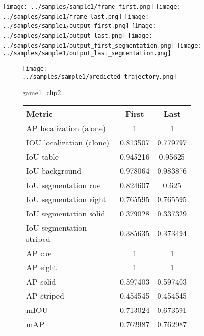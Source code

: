 \begin{figure}
    \texttt{[image: ../samples/sample1/frame\_first.png]}
    \texttt{[image: ../samples/sample1/frame\_last.png]}
    \newline
    \texttt{[image: ../samples/sample1/output\_first.png]}
    \texttt{[image: ../samples/sample1/output\_last.png]}
    \newline
    \texttt{[image: ../samples/sample1/output\_first\_segmentation.png]}
    \texttt{[image: ../samples/sample1/output\_last\_segmentation.png]}
    \newline
    \begin{subfigure}[b]{0.49\textwidth}
        \vspace{20pt}
        \texttt{[image: ../samples/sample1/predicted\_trajectory.png]}
        \caption*{game1\_clip2}
    \end{subfigure}
\begin{subfigure}[b]{0.49\textwidth}
    \begin{tabular}{|l|c|c|}
        \hline
        \textbf{Metric} & \textbf{First} & \textbf{Last} \\
        \hline
        AP localization (alone) & 1 & 1 \\ 
        IOU localization (alone) & 0.813507 & 0.779797 \\ 
        \hline
        IoU table & 0.945216 & 0.95625 \\ 
        IoU background & 0.978064 & 0.983876 \\ 
        \hline
        IoU segmentation cue & 0.824607 & 0.625 \\ 
        IoU segmentation eight & 0.765595 & 0.765595 \\ 
        IoU segmentation solid & 0.379028 & 0.337329 \\ 
        IoU segmentation striped & 0.385635 & 0.373494 \\ 
        \hline
        AP cue & 1 & 1 \\ 
        AP eight & 1 & 1 \\ 
        AP solid & 0.597403 & 0.597403 \\ 
        AP striped & 0.454545 & 0.454545 \\ 
        \hline
        mIOU & 0.713024 & 0.673591 \\ 
        mAP & 0.762987 & 0.762987 \\ 
        \hline
    \end{tabular}    
\end{subfigure}
\end{figure}


